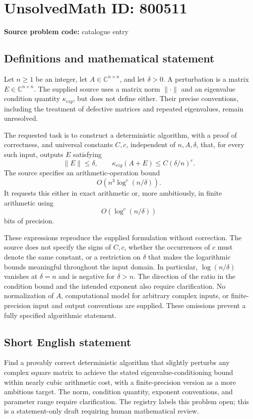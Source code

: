 \documentclass[11pt]{article}
\newcommand{\C}{\mathbb{C}}
\begin{document}
\section*{UnsolvedMath ID: 800511}
\textbf{Source problem code:} catalogue entry
\subsection{Definitions and mathematical statement}
Let \(n\geq 1\) be an integer, let \(A\in\C^{n\times n}\), and let \(\delta>0\). A perturbation is a matrix \(E\in\C^{n\times n}\). The supplied source uses a matrix norm \(\|\cdot\|\) and an eigenvalue condition quantity \(\kappa_{eig}\), but does not define either. Their precise conventions, including the treatment of defective matrices and repeated eigenvalues, remain unresolved.

The requested task is to construct a deterministic algorithm, with a proof of correctness, and universal constants \(C,c\), independent of \(n,A,\delta\), that, for every such input, outputs \(E\) satisfying
\[
\|E\|\leq\delta,
\qquad
\kappa_{eig}(A+E)\leq C(\delta/n)^c.
\]
The source specifies an arithmetic-operation bound
\[
O\!\left(n^3\log^c(n/\delta)\right).
\]
It requests this either in exact arithmetic or, more ambitiously, in finite arithmetic using
\[
O\!\left(\log^c(n/\delta)\right)
\]
bits of precision.

These expressions reproduce the supplied formulation without correction. The source does not specify the signs of \(C,c\), whether the occurrences of \(c\) must denote the same constant, or a restriction on \(\delta\) that makes the logarithmic bounds meaningful throughout the input domain. In particular, \(\log(n/\delta)\) vanishes at \(\delta=n\) and is negative for \(\delta>n\). The direction of the ratio in the condition bound and the intended exponent also require clarification. No normalization of \(A\), computational model for arbitrary complex inputs, or finite-precision input and output conventions are supplied. These omissions prevent a fully specified algorithmic statement.
\subsection{Short English statement}
Find a provably correct deterministic algorithm that slightly perturbs any complex square matrix to achieve the stated eigenvalue-conditioning bound within nearly cubic arithmetic cost, with a finite-precision version as a more ambitious target. The norm, condition quantity, exponent conventions, and parameter range require clarification. The registry labels this problem open; this is a statement-only draft requiring human mathematical review.
\end{document}
